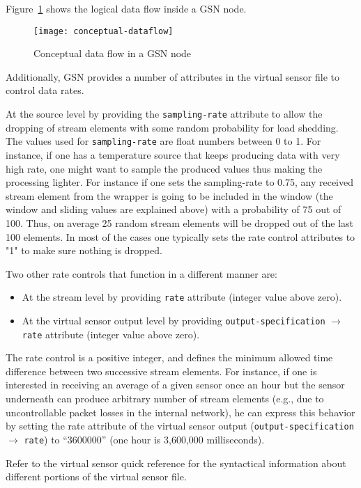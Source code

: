 Figure~\ref{fig:ConceptualDataFlow} shows the logical data flow inside
a GSN node.

\begin{figure}%
  \centering
  \texttt{[image: conceptual-dataflow]}
  \caption{Conceptual data flow in a GSN node}
  \label{fig:ConceptualDataFlow}
\end{figure}

Additionally, GSN provides a number of attributes in the virtual sensor file to control data rates.

At the source level by providing the \texttt{sampling-rate} attribute to allow the dropping of stream elements with some random probability for load shedding.
The values used for \texttt{sampling-rate} are float numbers between 0 to 1.
For instance, if one has a temperature source that keeps producing 
data with very high rate, one might want to sample the produced values 
thus making the processing lighter. For instance if one sets the 
sampling-rate to 0.75, any received stream element from the wrapper is going to be 
included in the window (the window and sliding values are explained above) with a probability of 75 out of 100.
Thus, on average 25 random stream elements will be dropped out of the last 100 elements.
In most of the cases one typically sets the rate control attributes to "1" to make sure nothing is dropped.

Two other rate controls that function in a different manner are:
\begin{itemize}
\item At the stream level by providing \texttt{rate} attribute (integer value above zero).
\item At the virtual sensor output level by providing \texttt{output-specification} $\rightarrow$ \texttt{rate} attribute (integer value above zero).
\end{itemize}

The rate control is a positive integer, and defines the minimum allowed time difference between two successive stream elements.
For instance, if one is interested in receiving an average of a given sensor once an hour but the sensor underneath can produce arbitrary number of stream elements 
(e.g., due to uncontrollable packet losses in the internal network), he can express this behavior by setting the rate attribute of the virtual sensor output 
(\texttt{output-specification} $\rightarrow$ \texttt{rate}) to ``3600000'' (one hour is 3,600,000 milliseconds).


Refer to the virtual sensor quick reference for the syntactical
information about different portions of the virtual sensor file.


